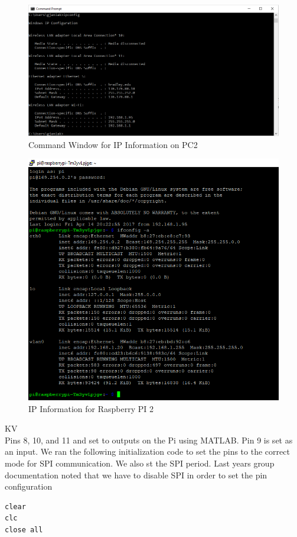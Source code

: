 \documentclass[fontsize=11pt, %
                             paper=letter, %
                             openany, %
                             captions=tableheading,
                             index=totoc,
                             hyperref]{labbook}
\begin{document}
\begin{addmargin}[0cm]{0cm}
\begin{figure}[H]
  \centering
  \includegraphics[width=1\textwidth]{figs/img/PC2_IP}
  \caption{Command Window for IP Information on PC2}
  \label{fig:PC2_IP}
\end{figure}

\begin{figure}[H]
  \centering
  \includegraphics[width=1\textwidth]{figs/img/RaspPI_IP}
  \caption{IP Information for Raspberry PI 2}
  \label{fig:RaspPI_IP}
\end{figure}

KV\\
Pins 8, 10, and 11 and set to outputs on the Pi using MATLAB.  Pin 9 is set as an input.  We ran the following initialization code to set the pins to the correct mode for SPI communication.  We also st the SPI period.  Last years group documentation noted that we have to disable SPI in order to set the pin configuration
\begin{lstlisting}
clear
clc
close all


\end{lstlisting}
\end{addmargin}
\end{document}
